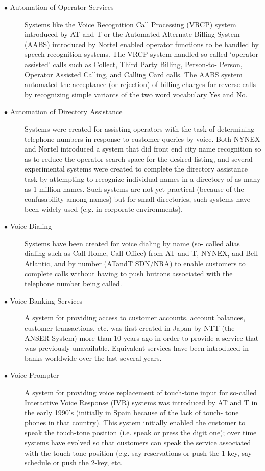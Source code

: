 \documentclass[12pt,a4paper,oldfontcommands]{memoir}
\begin{document}
\begin{description}
  \item[$\bullet$ Automation of Operator Services] Systems like the Voice Recognition Call Processing (VRCP) system introduced by AT and T or the Automated Alternate Billing System (AABS) introduced by Nortel enabled operator functions to be handled by speech recognition systems. The VRCP system handled so-called ‘operator assisted’ calls such as Collect, Third Party Billing, Person-to- Person, Operator Assisted Calling, and Calling Card calls. The AABS system automated the acceptance (or rejection) of billing charges for reverse calls by recognizing simple variants of the two word vocabulary Yes and No.
  \item[$\bullet$ Automation of Directory Assistance]  Systems were created for assisting operators with the task of determining telephone numbers in response to customer queries by voice. Both NYNEX and Nortel introduced a system that did front end city name recognition so as to reduce the operator search space for the desired listing, and several experimental systems were created to complete the directory assistance task by attempting to recognize individual names in a directory of as many as 1 million names. Such systems are not yet practical (because of the confusability among names) but for small directories, such systems have been widely used (e.g. in corporate environments).
  \item[$\bullet$ Voice Dialing] Systems have been created for voice dialing by name (so- called alias dialing such as Call Home, Call Office) from AT and T, NYNEX, and Bell Atlantic, and by number (ATandT SDN/NRA) to enable customers to complete calls without having to push buttons associated with the telephone number being called.
  \item[$\bullet$ Voice Banking Services] A system for providing access to customer accounts, account balances, customer transactions, etc. was first created in Japan by NTT (the ANSER System) more than 10 years ago in order to provide a service that was previously unavailable. Equivalent services have been introduced in banks worldwide over the last several years. 
  \item[$\bullet$ Voice Prompter]A system for providing voice replacement of touch-tone input for so-called Interactive Voice Response (IVR) systems was introduced by AT and T in the early 1990’s (initially in Spain because of the lack of touch- tone phones in that country). This system initially enabled the customer to speak the touch-tone position (i.e. speak or press the digit one); over time systems have evolved so that customers can speak the service associated with the touch-tone position (e.g. say reservations or push the 1-key, say schedule or push the 2-key, etc. 

\end{description}
\end{document}

